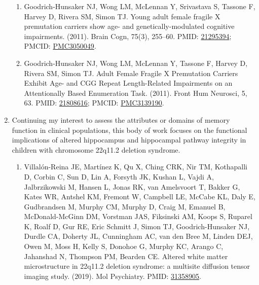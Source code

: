 \documentclass{nihbiosketch}
\begin{document}
\begin{enumerate}
\begin{enumerate}
	      	\item Goodrich-Hunsaker NJ, Wong LM, McLennan Y, Srivastava S, Tassone F, Harvey D, Rivera SM, Simon TJ. Young adult female fragile X premutation carriers show age- and genetically-modulated cognitive impairments. (2011). Brain Cogn, 75(3), 255--60. PMID: \href{https:/pubmed.ncbi.nlm.nih.gov/21295394}{21295394}; PMCID: \href{https://www.ncbi.nlm.nih.gov/pmc/articles/PMC3050049}{PMC3050049}. 
	      	      
	      	\item Goodrich-Hunsaker NJ, Wong LM, McLennan Y, Tassone F, Harvey D, Rivera SM, Simon TJ. Adult Female Fragile X Premutation Carriers Exhibit Age- and CGG Repeat Length-Related Impairments on an Attentionally Based Enumeration Task. (2011). Front Hum Neurosci, 5, 63. PMID: \href{https:/pubmed.ncbi.nlm.nih.gov/21808616}{21808616}; PMCID: \href{https://www.ncbi.nlm.nih.gov/pmc/articles/PMC3139190}{PMC3139190}.
	      	      
	      \end{enumerate}
	     
    \item Continuing my interest to assess the attributes or domains of memory function in clinical populations, this body of work focuses on the functional implications of altered hippocampus and hippocampal pathway integrity in children with chromosome 22q11.2 deletion syndrome.
	      
	      \begin{enumerate}   
	      	
	      	\item Villalón-Reina JE, Martínez K, Qu X, Ching CRK, Nir TM, Kothapalli D, Corbin C, Sun D, Lin A, Forsyth JK, Kushan L, Vajdi A, Jalbrzikowski M, Hansen L, Jonas RK, van Amelsvoort T, Bakker G, Kates WR, Antshel KM, Fremont W, Campbell LE, McCabe KL, Daly E, Gudbrandsen M, Murphy CM, Murphy D, Craig M, Emanuel B, McDonald-McGinn DM, Vorstman JAS, Fiksinski AM, Koops S, Ruparel K, Roalf D, Gur RE, Eric Schmitt J, Simon TJ, Goodrich-Hunsaker NJ, Durdle CA, Doherty JL, Cunningham AC, van den Bree M, Linden DEJ, Owen M, Moss H, Kelly S, Donohoe G, Murphy KC, Arango C, Jahanshad N, Thompson PM, Bearden CE. Altered white matter microstructure in 22q11.2 deletion syndrome: a multisite diffusion tensor imaging study. (2019). Mol Psychiatry. PMID: \href{https://www.pubmed.ncbi.nlm.nih.gov/31358905}{31358905}.
	      	

\end{enumerate}
\end{enumerate}
\end{document}
